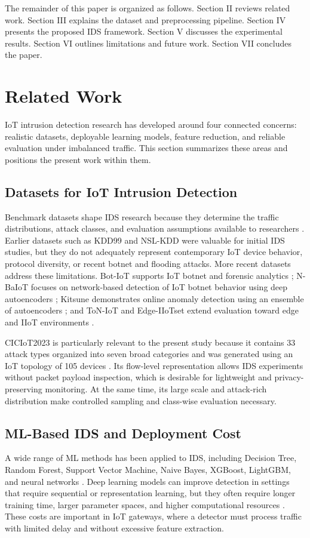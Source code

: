 \documentclass[journal]{IEEEtran}
\begin{document}
The remainder of this paper is organized as follows. Section II reviews related work. Section III explains the dataset and preprocessing pipeline. Section IV presents the proposed IDS framework. Section V discusses the experimental results. Section VI outlines limitations and future work. Section VII concludes the paper.


\section{Related Work}
IoT intrusion detection research has developed around four connected concerns: realistic datasets, deployable learning models, feature reduction, and reliable evaluation under imbalanced traffic. This section summarizes these areas and positions the present work within them.

\subsection{Datasets for IoT Intrusion Detection}
Benchmark datasets shape IDS research because they determine the traffic distributions, attack classes, and evaluation assumptions available to researchers \cite{khraisat2019survey,thakkar2020datasets}. Earlier datasets such as KDD99 and NSL-KDD were valuable for initial IDS studies, but they do not adequately represent contemporary IoT device behavior, protocol diversity, or recent botnet and flooding attacks. More recent datasets address these limitations. Bot-IoT supports IoT botnet and forensic analytics \cite{koroniotis2019botiot}; N-BaIoT focuses on network-based detection of IoT botnet behavior using deep autoencoders \cite{meidan2018nbaiot}; Kitsune demonstrates online anomaly detection using an ensemble of autoencoders \cite{mirsky2018kitsune}; and ToN-IoT and Edge-IIoTset extend evaluation toward edge and IIoT environments \cite{moustafa2020toniot,ferrag2022edgeiiotset}.

CICIoT2023 is particularly relevant to the present study because it contains 33 attack types organized into seven broad categories and was generated using an IoT topology of 105 devices \cite{neto2023ciciot}. Its flow-level representation allows IDS experiments without packet payload inspection, which is desirable for lightweight and privacy-preserving monitoring. At the same time, its large scale and attack-rich distribution make controlled sampling and class-wise evaluation necessary.

\subsection{ML-Based IDS and Deployment Cost}
A wide range of ML methods has been applied to IDS, including Decision Tree, Random Forest, Support Vector Machine, Naive Bayes, XGBoost, LightGBM, and neural networks \cite{khraisat2019survey,hajiheidari2019iotids}. Deep learning models can improve detection in settings that require sequential or representation learning, but they often require longer training time, larger parameter spaces, and higher computational resources \cite{kwon2019deep}. These costs are important in IoT gateways, where a detector must process traffic with limited delay and without excessive feature extraction.
\end{document}
